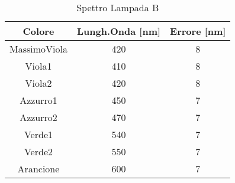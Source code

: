 \begin{table}[H]
\begin{center}
\caption{Spettro Lampada B}
\begin{tabular}{|c|c|c|}
\hline
Colore & Lungh.Onda [nm] & Errore [nm] \\ 
\hline
MassimoViola & 420 & 8 \\
\hline
Viola1 & 410 & 8 \\ 
Viola2 & 420 & 8 \\ 
Azzurro1 & 450 & 7 \\ 
Azzurro2 & 470 & 7 \\ 
Verde1 & 540 & 7 \\ 
Verde2 & 550 & 7 \\ 
Arancione & 600 & 7 \\ 
\hline
\end{tabular}
\end{center}
\label{label}
\end{table}
